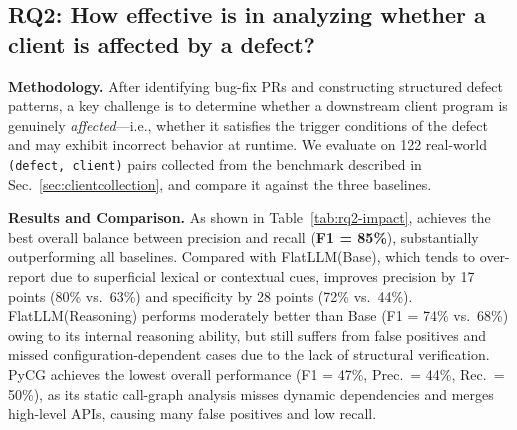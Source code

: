 




\subsection{RQ2: How effective is \appname in analyzing whether a client is affected by a defect?}
\noindent\textbf{Methodology.}
After identifying bug-fix PRs and constructing structured defect patterns, a key challenge is to determine whether a downstream client program is genuinely \textit{affected}—i.e., whether it satisfies the trigger conditions of the defect and may exhibit incorrect behavior at runtime.
We evaluate \appname on 122 real-world \texttt{(defect, client)} pairs collected from the benchmark described in Sec.~\ref{sec:clientcollection}, and compare it against the three baselines.

\noindent\textbf{Results and Comparison.}
As shown in Table~\ref{tab:rq2-impact}, \appname achieves the best overall balance between precision and recall (\textbf{F1 = 85\%}), substantially outperforming all baselines.
Compared with FlatLLM(Base), which tends to over-report due to superficial lexical or contextual cues, \appname improves precision by 17 points (80\% vs.\ 63\%) and specificity by 28 points (72\% vs.\ 44\%).
FlatLLM(Reasoning) performs moderately better than Base (F1 = 74\% vs.\ 68\%) owing to its internal reasoning ability, but still suffers from false positives and missed configuration-dependent cases due to the lack of structural verification.
PyCG achieves the lowest overall performance (F1 = 47\%, Prec.\ = 44\%, Rec.\ = 50\%), as its static call-graph analysis misses dynamic dependencies and merges high-level APIs, causing many false positives and low recall.

